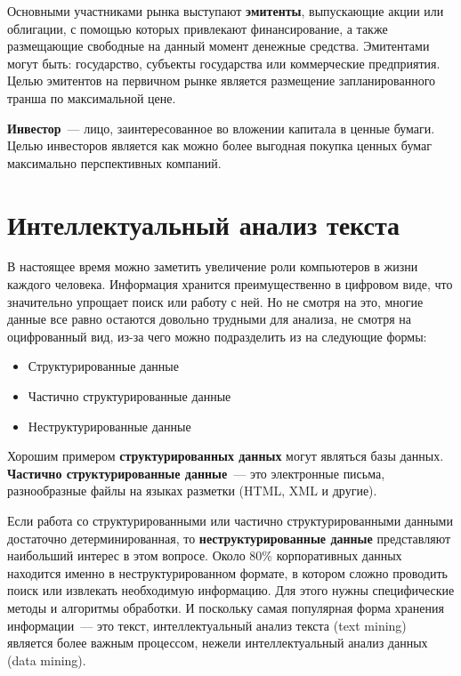\documentclass[14pt]{matmex-diploma-custom}
\begin{document}
Основными участниками рынка выступают \textbf{эмитенты}, выпускающие акции или облигации, с помощью которых привлекают финансирование, а также размещающие свободные на данный момент денежные средства. Эмитентами могут быть: государство, субъекты государства или коммерческие предприятия. Целью эмитентов на первичном рынке является размещение запланированного транша по максимальной цене.

\textbf{Инвестор}~--- лицо, заинтересованное во вложении капитала в ценные бумаги. Целью инвесторов является как можно более выгодная покупка ценных бумаг максимально перспективных компаний.

\clearpage\section{Интеллектуальный анализ текста}

\label{sec:analysis}

В настоящее время можно заметить увеличение роли компьютеров в жизни каждого человека. Информация хранится преимущественно в цифровом виде, что значительно упрощает поиск или работу с ней. Но не смотря на это, многие данные все равно остаются довольно трудными для анализа, не смотря на оцифрованный вид, из-за чего можно подразделить из на следующие формы:

\begin{itemize}
\item Структурированные данные
\item Частично структурированные данные
\item Неструктурированные данные
\end{itemize}

Хорошим примером \textbf{структурированных данных} могут являться базы данных. \textbf{Частично структурированные данные}~--- это электронные письма, разнообразные файлы на языках разметки (HTML, XML и другие).

Если работа со структурированными или частично структурированными данными достаточно детерминированная, то \textbf{неструктурированные данные} представляют наибольший интерес в этом вопросе. Около 80\% корпоративных данных находится именно в неструктурированном формате, в котором сложно проводить поиск или извлекать необходимую информацию. Для этого нужны специфические методы и алгоритмы обработки. И поскольку самая популярная форма хранения информации~--- это текст, интеллектуальный анализ текста (text mining) является более важным процессом, нежели интеллектуальный анализ данных (data mining).
\end{document}
